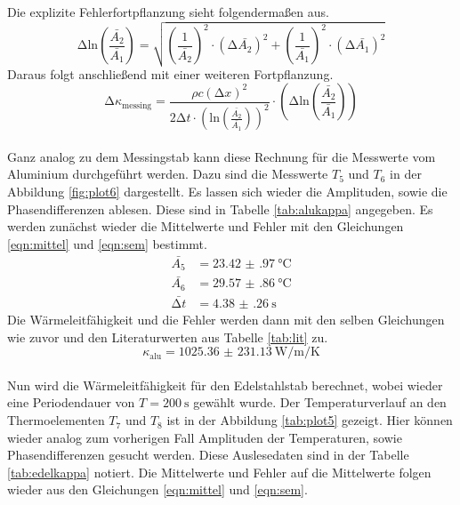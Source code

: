 Die explizite Fehlerfortpflanzung sieht folgendermaßen aus.
\begin{equation}
    \increment \text{ln} \left( \frac{\bar{A_{2}}}{\bar{A_{1}}}\right) = \sqrt{\left( \frac{1}{\bar{A_{2}}} \right)^{2}  \cdot (\increment \bar{A_{2}})^2 + \left( \frac{1}{\bar{A_{1}}}\right)^2 \cdot (\increment \bar{A_{1}})^2}
\end{equation}
Daraus folgt anschließend mit einer weiteren Fortpflanzung.
\begin{equation}
    \increment \kappa_{\text{messing}} = \frac{\rho c \left ( \increment x \right )^2}{2 \increment t \cdot \left(\text{ln} \left( \frac{\bar{A_{2}}}{\bar{A_{1}}}\right)\right)^2} \cdot \left(\increment \text{ln} \left( \frac{\bar{A_{2}}}{\bar{A_{1}}}\right)\right)
\end{equation}
\\
\newline
Ganz analog zu dem Messingstab kann diese Rechnung für die Messwerte vom Aluminium durchgeführt werden. Dazu sind die Messwerte $T_{5}$ und $T_{6}$ in der Abbildung \ref{fig:plot6} dargestellt. Es lassen sich wieder die Amplituden,
 sowie die Phasendifferenzen ablesen. Diese sind in Tabelle \ref{tab:alukappa} angegeben. Es werden zunächst wieder die Mittelwerte und Fehler mit den Gleichungen \ref{eqn:mittel} und \ref{eqn:sem} bestimmt.
\begin{align}
    \bar{A_{5}} &= \SI{23.42(97)}{\celsius}      \\
    \bar{A_{6}} &=  \SI{29.57(86)}{\celsius}        \\
    \bar{\increment t} &= \SI{4.38(26)}{\second}
\end{align}
Die Wärmeleitfähigkeit und die Fehler werden dann mit den selben Gleichungen wie zuvor und den Literaturwerten aus Tabelle \ref{tab:lit} zu.
\begin{equation}
    \kappa_{\text{alu}} = \SI{1025.36(23113)}{\watt\per\meter\per\kelvin}
\end{equation}
\\
\newline
Nun wird die Wärmeleitfähigkeit für den Edelstahlstab berechnet, wobei wieder eine Periodendauer von $T = \SI{200}{\second}$ gewählt wurde. Der Temperaturverlauf an den Thermoelementen 
$T_{7}$ und $T_{8}$ ist in der Abbildung \ref{tab:plot5} gezeigt. Hier können wieder analog zum vorherigen Fall Amplituden der Temperaturen, sowie Phasendifferenzen gesucht werden. Diese Auslesedaten sind in der Tabelle
\ref{tab:edelkappa} notiert.
Die Mittelwerte und Fehler auf die Mittelwerte folgen wieder aus den Gleichungen \ref{eqn:mittel} und \ref{eqn:sem}.
